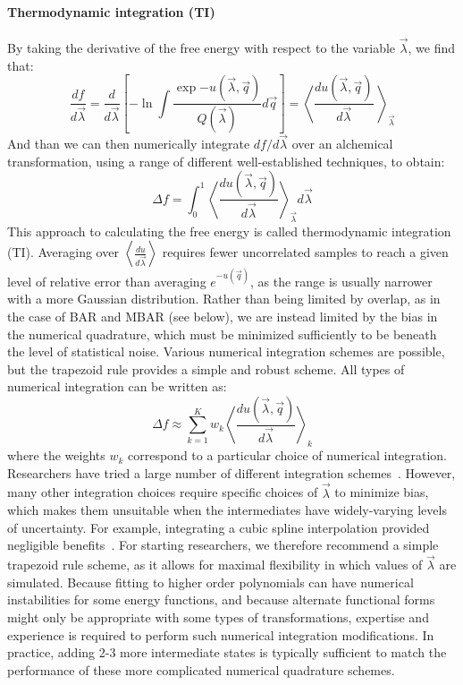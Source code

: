 \documentclass[9pt,bestpractices]{livecoms}
\newcommand{\expect}[1]{\left\langle{#1}\right\rangle}
\begin{document}
\paragraph{Thermodynamic integration (TI)}
By taking the derivative of the free energy with respect to the
variable $\vec{\lambda}$, we find that:
\begin{equation}
\frac{df}{d\vec{\lambda}} = \frac{d}{d\vec{\lambda}} \left[-\ln \int \frac{\exp{-u(\vec{\lambda},\vec{q})}}{Q(\vec{\lambda})} d\vec{q}\right] = \expect{\frac{du(\vec{\lambda},\vec{q})}{d\vec{\lambda}}\
}_{\vec{\lambda}} 
\end{equation}
And than we can then numerically integrate $df/d\vec{\lambda}$ over an alchemical transformation, using a range of different well-established techniques, to obtain:
\begin{equation}
\Delta f    = \int_{0}^{1} \expect{\frac{du(\vec{\lambda},\vec{q})}{d\vec{\lambda}}}_{\vec{\lambda}}  d\vec{\lambda}    
\end{equation}
This approach to calculating the free energy is called thermodynamic integration (TI). Averaging over $\expect{\frac{du}{d\vec{\lambda}}}$ requires fewer uncorrelated samples to reach a given level of relative error
than averaging $e^{-u(\vec{q})}$, as the range is usually narrower with a more Gaussian distribution. Rather than being limited by overlap, as in the case of BAR and MBAR (see below), we are instead limited by the bias in the numerical quadrature, which must be minimized sufficiently to be beneath the level of statistical noise.
%
Various numerical integration schemes are possible, but the trapezoid
rule provides a simple and robust scheme.  All types of numerical integration can be written as:
\[ \Delta f \approx \sum_{k=1}^{K} w_k
\expect{\frac{du(\vec{\lambda},\vec{q})}{d\vec{\lambda}}}_{k} \] where the weights $w_k$ correspond to a particular choice of numerical integration.
Researchers have tried a large number of different integration schemes~\cite{resat1993studies,jorge2010effect,shyu2009reducing}. However, many other integration choices require specific choices of $\vec{\lambda}$ to minimize bias, which makes them unsuitable when the intermediates
have widely-varying levels of uncertainty. For example, integrating a cubic spline interpolation provided negligible benefits~\cite{paliwal2011benchmark}. For starting researchers, we therefore recommend a simple trapezoid rule scheme, as it allows for maximal flexibility in which values of $\vec{\lambda}$ are simulated.  Because fitting to higher order polynomials can have numerical instabilities for some energy functions, and because alternate functional forms might only be appropriate with some types of transformations, expertise and experience is required to perform such numerical integration modifications. In practice, adding 2-3 more intermediate states is typically sufficient to match the performance of these more complicated numerical quadrature schemes.
\end{document}
